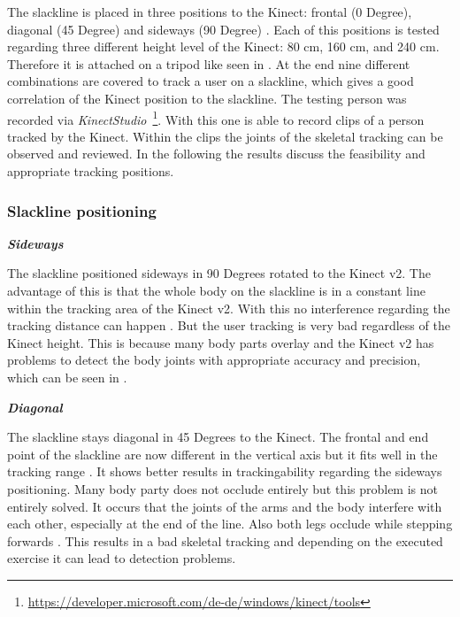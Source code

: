 The slackline is placed in three positions to the Kinect: frontal (0 Degree), diagonal (45 Degree) and sideways (90 Degree) \textbf{}. Each of this positions is tested regarding three different height level of the Kinect: 80 cm, 160 cm, and 240 cm. Therefore it is attached on a tripod like seen in \textbf{}. At the end nine different combinations are covered to track a user on a slackline, which gives a good correlation of the Kinect position to the slackline. The testing person was recorded via \textit{KinectStudio}~\footnote{\url{https://developer.microsoft.com/de-de/windows/kinect/tools}}. With this one is able to record clips of a person tracked by the Kinect. Within the clips the joints of the skeletal tracking can be observed and reviewed. In the following the results discuss the feasibility and appropriate tracking positions.

\subsubsection{Slackline positioning}
\textit{\textbf{Sideways}}

The slackline positioned sideways in 90 Degrees rotated to the Kinect v2. The advantage of this is that the whole body on the slackline is in a constant line within the tracking area of the Kinect v2. With this no interference regarding the tracking distance can happen \textbf{}. But the user tracking is very bad regardless of the Kinect height. This is because many body parts overlay and the Kinect v2 has problems to detect the body joints with appropriate accuracy and precision, which can be seen in \textbf{}.

\textit{\textbf{Diagonal}}

The slackline stays diagonal in 45 Degrees to the Kinect. The frontal and end point of the slackline are now different in the vertical axis but it fits well in the tracking range \textbf{}. 
It shows better results in trackingability regarding the sideways positioning. Many body party does not occlude entirely but this problem is not entirely solved. It occurs that the joints of the arms and the body interfere with each other, especially at the end of the line. Also both legs occlude while stepping forwards \textbf{}. This results in a bad skeletal tracking and depending on the executed exercise it can lead to detection problems.


